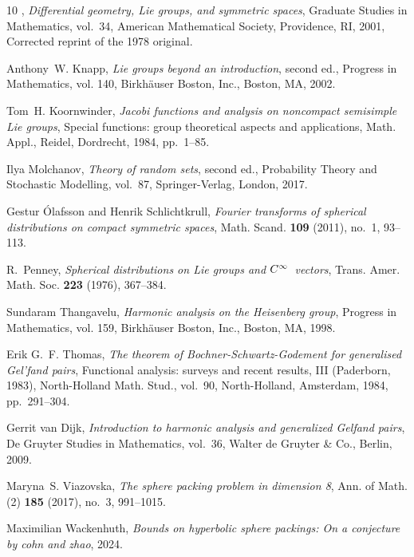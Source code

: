 \documentclass[12pt,reqno,a4paper]{amsart}
\theoremstyle{theorem}
\theoremstyle{definition}
\numberwithin{theorem}{section}
\numberwithin{equation}{section}
\begin{document}
\begin{thebibliography}{10}
\bysame, \emph{Differential geometry, {L}ie groups, and symmetric spaces},
  Graduate Studies in Mathematics, vol.~34, American Mathematical Society,
  Providence, RI, 2001, Corrected reprint of the 1978 original. 

Anthony~W. Knapp, \emph{Lie groups beyond an introduction}, second ed.,
  Progress in Mathematics, vol. 140, Birkh\"auser Boston, Inc., Boston, MA,
  2002. 

Tom~H. Koornwinder, \emph{Jacobi functions and analysis on noncompact
  semisimple {L}ie groups}, Special functions: group theoretical aspects and
  applications, Math. Appl., Reidel, Dordrecht, 1984, pp.~1--85. 

Ilya Molchanov, \emph{Theory of random sets}, second ed., Probability Theory
  and Stochastic Modelling, vol.~87, Springer-Verlag, London, 2017.

Gestur \'Olafsson and Henrik Schlichtkrull, \emph{Fourier transforms of
  spherical distributions on compact symmetric spaces}, Math. Scand.
  \textbf{109} (2011), no.~1, 93--113. 

R.~Penney, \emph{Spherical distributions on {L}ie groups and {$C\sp{\infty }$}\
  vectors}, Trans. Amer. Math. Soc. \textbf{223} (1976), 367--384. 

Sundaram Thangavelu, \emph{Harmonic analysis on the {H}eisenberg group},
  Progress in Mathematics, vol. 159, Birkh\"auser Boston, Inc., Boston, MA,
  1998. \MR{1633042}

Erik G.~F. Thomas, \emph{The theorem of {B}ochner-{S}chwartz-{G}odement for
  generalised {G}el'fand pairs}, Functional analysis: surveys and recent
  results, {III} ({P}aderborn, 1983), North-Holland Math. Stud., vol.~90,
  North-Holland, Amsterdam, 1984, pp.~291--304. \MR{761388}

Gerrit van Dijk, \emph{Introduction to harmonic analysis and generalized
  {G}elfand pairs}, De Gruyter Studies in Mathematics, vol.~36, Walter de
  Gruyter \& Co., Berlin, 2009. \MR{2640609}

Maryna~S. Viazovska, \emph{The sphere packing problem in dimension 8}, Ann. of
  Math. (2) \textbf{185} (2017), no.~3, 991--1015. \MR{3664816}

Maximilian Wackenhuth, \emph{{B}ounds on hyperbolic sphere packings: {O}n a
  conjecture by cohn and zhao}, 2024.


\end{thebibliography}
\end{document}
